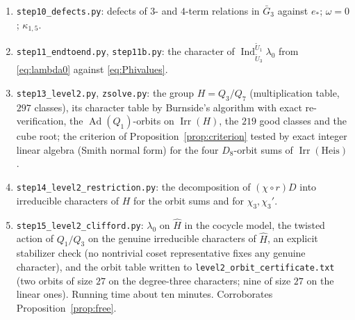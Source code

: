\documentclass[11pt]{article}
\newcommand{\Irr}{\operatorname{Irr}}
\newcommand{\Ind}{\operatorname{Ind}}
\newcommand{\Ad}{\operatorname{Ad}}
\newcommand{\tU}{\widetilde U}
\theoremstyle{plain}
\theoremstyle{definition}
\begin{document}
\begin{enumerate}[label=\arabic*.]
Proposition~\ref{prop:H1}: (H1) through cube roots (Hensel in $F(X)$),
through \eqref{eq:H1identity} ($7600$ stratified instances), and
through \eqref{eq:H1reduced} and \eqref{eq:H1identity} on $12{,}000$
instances covering every case of the proof; script~12 also verifies the
closed form \eqref{eq:ell} against the digit form and the symbol facts
\eqref{eq:level0}.
\item \texttt{step10\_defects.py}: defects of $3$- and $4$-term
relations in $\bar G_3$ against $e_*$; $\omega=0$; $\kappa_{1,5}$.
\item \texttt{step11\_endtoend.py}, \texttt{step11b.py}: the character
of $\Ind_{\tU_3}^{\tU_1}\lambda_0$ from \eqref{eq:lambda0} against
\eqref{eq:Phivalues}.
\item \texttt{step13\_level2.py}, \texttt{zsolve.py}: the group
$H=Q_3/Q_7$ (multiplication table, $297$ classes), its character table
by Burnside's algorithm with exact re-verification, the $\Ad(Q_1)$-orbits
on $\Irr(H)$, the $219$ good classes and the cube root; the criterion
of Proposition~\ref{prop:criterion} tested by exact integer linear
algebra (Smith normal form) for the four $D_8$-orbit sums of
$\Irr(\mathrm{Heis})$.
\item \texttt{step14\_level2\_restriction.py}: the decomposition of
$(\chi\circ r)D$ into irreducible characters of $H$ for the orbit sums
and for $\chi_3,\chi_3'$.
\item \texttt{step15\_level2\_clifford.py}: $\lambda_0$ on $\hat H$ in
the cocycle model, the twisted action of $Q_1/Q_3$ on the genuine
irreducible characters of $\hat H$, an explicit stabilizer check (no
nontrivial coset representative fixes any genuine character), and the
orbit table written to \texttt{level2\_orbit\_certificate.txt} (two
orbits of size $27$ on the degree-three characters; nine of size $27$
on the linear ones).  Running time about ten minutes.  Corroborates
Proposition~\ref{prop:free}.
\end{enumerate}
\end{document}
